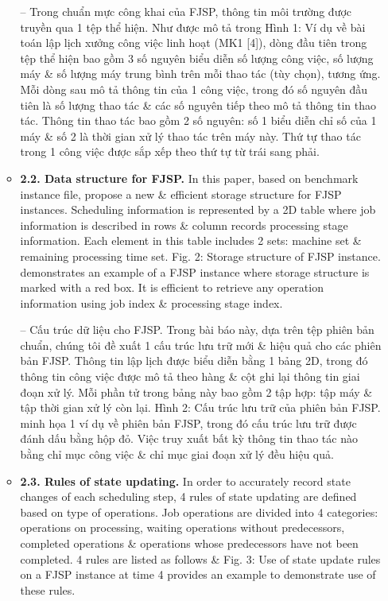 \documentclass{article}
\begin{document}
\begin{itemize}
\begin{itemize}
        -- Trong chuẩn mực công khai của FJSP, thông tin môi trường được truyền qua 1 tệp thể hiện. Như được mô tả trong {\sf Hình 1: Ví dụ về bài toán lập lịch xưởng công việc linh hoạt (MK1 [4])}, dòng đầu tiên trong tệp thể hiện bao gồm 3 số nguyên biểu diễn số lượng công việc, số lượng máy \& số lượng máy trung bình trên mỗi thao tác (tùy chọn), tương ứng. Mỗi dòng sau mô tả thông tin của 1 công việc, trong đó số nguyên đầu tiên là số lượng thao tác \& các số nguyên tiếp theo mô tả thông tin thao tác. Thông tin thao tác bao gồm 2 số nguyên: số 1 biểu diễn chỉ số của 1 máy \& số 2 là thời gian xử lý thao tác trên máy này. Thứ tự thao tác trong 1 công việc được sắp xếp theo thứ tự từ trái sang phải.
        \item {\bf2.2. Data structure for FJSP.} In this paper, based on benchmark instance file, propose a new \& efficient storage structure for FJSP instances. Scheduling information is represented by a 2D table where job information is described in rows \& column records processing stage information. Each element in this table includes 2 sets: machine set \& remaining processing time set. {\sf Fig. 2: Storage structure of FJSP instance.} demonstrates an example of a FJSP instance where storage structure is marked with a red box. It is efficient to retrieve any operation information using job index \& processing stage index.

        -- {\sf Cấu trúc dữ liệu cho FJSP.} Trong bài báo này, dựa trên tệp phiên bản chuẩn, chúng tôi đề xuất 1 cấu trúc lưu trữ mới \& hiệu quả cho các phiên bản FJSP. Thông tin lập lịch được biểu diễn bằng 1 bảng 2D, trong đó thông tin công việc được mô tả theo hàng \& cột ghi lại thông tin giai đoạn xử lý. Mỗi phần tử trong bảng này bao gồm 2 tập hợp: tập máy \& tập thời gian xử lý còn lại. {\sf Hình 2: Cấu trúc lưu trữ của phiên bản FJSP.} minh họa 1 ví dụ về phiên bản FJSP, trong đó cấu trúc lưu trữ được đánh dấu bằng hộp đỏ. Việc truy xuất bất kỳ thông tin thao tác nào bằng chỉ mục công việc \& chỉ mục giai đoạn xử lý đều hiệu quả.
        \item {\bf2.3. Rules of state updating.} In order to accurately record state changes of each scheduling step, 4 rules of state updating are defined based on type of operations. Job operations are divided into 4 categories: operations on processing, waiting operations without predecessors, completed operations \& operations whose predecessors have not been completed. 4 rules are listed as follows \& {\sf Fig. 3: Use of state update rules on a FJSP instance at time 4} provides an example to demonstrate use of these rules.


\end{itemize}
\end{itemize}
\end{document}
